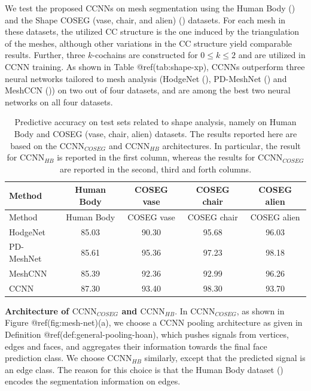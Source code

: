 \documentclass[
  12pt,
]{krantz}
\begin{document}
We test the proposed CCNNs on mesh segmentation using the Human Body
() and the Shape
COSEG (vase, chair, and alien) () datasets. For each mesh in these datasets, the utilized CC
structure is the one induced by the triangulation of the meshes,
although other variations in the CC structure yield comparable results.
Further, three \(k\)-cochains are constructed for \(0\leq k \leq 2\) and
are utilized in CCNN training. As shown in Table @ref(tab:shape-xp),
CCNNs outperform three neural networks tailored to mesh analysis
(HodgeNet (), PD-MeshNet ()
and MeshCCN ()) on
two out of four datasets, and are among the best two neural networks on
all four datasets.

\begin{longtable}[]{@{}lcccc@{}}
\caption{Predictive accuracy on test sets related to shape analysis,
namely on Human Body and COSEG (vase, chair, alien) datasets. The
results reported here are based on the \(\mbox{CCNN}_{COSEG}\) and
\(\mbox{CCNN}_{HB}\) architectures. In particular, the result for
\(\mbox{CCNN}_{HB}\) is reported in the first column, whereas the
results for \(\mbox{CCNN}_{COSEG}\) are reported in the second, third
and forth columns.}\tabularnewline
\toprule\noalign{}
Method & Human Body & COSEG vase & COSEG chair & COSEG alien \\
\midrule\noalign{}
\endfirsthead
\toprule\noalign{}
Method & Human Body & COSEG vase & COSEG chair & COSEG alien \\
\midrule\noalign{}
\endhead
\bottomrule\noalign{}
\endlastfoot
HodgeNet & 85.03 & 90.30 & 95.68 & 96.03 \\
PD-MeshNet & 85.61 & 95.36 & 97.23 & 98.18 \\
MeshCNN & 85.39 & 92.36 & 92.99 & 96.26 \\
CCNN & 87.30 & 93.40 & 98.30 & 93.70 \\
\end{longtable}

\textbf{Architecture of \(\mbox{CCNN}_{COSEG}\) and
\(\mbox{CCNN}_{HB}\)}. In \(\mbox{CCNN}_{COSEG}\), as shown in Figure
@ref(fig:mesh-net)(a), we choose a CCNN pooling architecture as given in
Definition @ref(def:general-pooling-hoan), which pushes signals from
vertices, edges and faces, and aggregates their information towards the
final face prediction class. We choose \(\mbox{CCNN}_{HB}\) similarly,
except that the predicted signal is an edge class. The reason for this
choice is that the Human Body dataset
() encodes
the segmentation information on edges.
\end{document}
